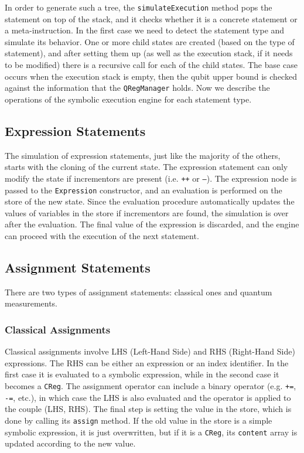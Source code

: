 \documentclass[12pt,a4paper]{report}
\theoremstyle{definition}
\theoremstyle{definition}
\theoremstyle{definition}
\begin{document}
In order to generate such a tree, the \texttt{simulateExecution} method pops the statement on top of the stack, and it checks whether it is a concrete statement or a meta-instruction. In the first case we need to detect the statement type and simulate its behavior. One or more child states are created (based on the type of statement), and after setting them up (as well as the execution stack, if it needs to be modified) there is a recursive call for each of the child states. The base case occurs when the execution stack is empty, then the qubit upper bound is checked against the information that the \texttt{QRegManager} holds.
Now we describe the operations of the symbolic execution engine for each statement type.

\subsection{Expression Statements}
The simulation of expression statements, just like the majority of the others, starts with the cloning of the current state. The expression statement can only modify the state if incrementors are present (i.e. \texttt{++} or \texttt{--}). The expression node is passed to the \texttt{Expression} constructor, and an evaluation is performed on the store of the new state. Since the evaluation procedure automatically updates the values of variables in the store if incrementors are found, the simulation is over after the evaluation. The final value of the expression is discarded, and the engine can proceed with the execution of the next statement.
\subsection{Assignment Statements}
There are two types of assignment statements: classical ones and quantum measurements.
\subsubsection{Classical Assignments}
Classical assignments involve LHS (Left-Hand Side) and RHS (Right-Hand Side) expressions. The RHS can be either an expression or an index identifier. In the first case it is evaluated to a symbolic expression, while in the second case it becomes a \texttt{CReg}. The assignment operator can include a binary operator (e.g. \texttt{+=}, \texttt{-=}, etc.), in which case the LHS is also evaluated and the operator is applied to the couple (LHS, RHS).
The final step is setting the value in the store, which is done by calling its \texttt{assign} method. If the old value in the store is a simple symbolic expression, it is just overwritten, but if it is a \texttt{CReg}, its \texttt{content} array is updated according to the new value.
\end{document}
